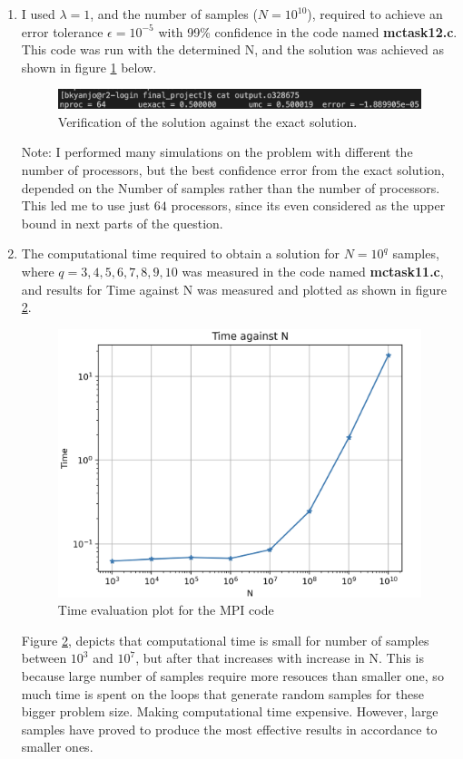 \documentclass[12pt,a4paper]{article}
\begin{document}
\begin{enumerate}
	\item I used $\lambda = 1$, and the number of samples ($N = 10^{10}$), required to achieve  an error tolerance $\epsilon = 10^{-5} $ with 99\% confidence in the code named \textbf{mc\textunderscore task1\textunderscore 2.c}. This code was run with the determined  N, and the solution was achieved as shown in figure \ref{fig:t11} below. 
	
	\begin{figure}[H]
		\centering
		\includegraphics[width=0.7\linewidth]{t11}
		\caption{Verification of the solution against the exact solution.}
		\label{fig:t11}
	\end{figure}
	Note: I performed many simulations on the problem with different the number of processors, but the best confidence error from the exact solution, depended on the Number of samples rather than the number of processors. This led me to use just $64$ processors, since its even considered as the upper bound in next parts of the question.
	
	
\item The computational time required to obtain a solution for $N = 10^{q}$ samples, where $q = 3,4,5,6,7,8,9,10$ was measured in the code named \textbf{mc\textunderscore task1\textunderscore 1.c}, and results for Time against N was measured and plotted as shown in figure \ref{fig:t12}. 

	\begin{figure}[H]
	\centering
	\includegraphics[width=0.7\linewidth]{t12}
	\caption{Time evaluation plot for the MPI code}
	\label{fig:t12}
\end{figure}

Figure \ref{fig:t12}, depicts that computational time is small for number of samples between $10^{3}$ and $10^{7}$, but after that increases with increase in N. This is because large number of samples require more resouces than smaller one, so much time is spent on the loops that generate random samples for these bigger problem size. Making computational time expensive.  However, large samples have proved to produce the most effective results in accordance to smaller ones.


\end{enumerate}
\end{document}
